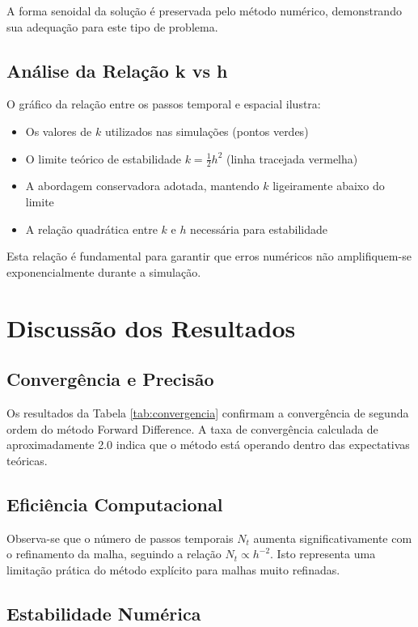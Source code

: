 \documentclass[a4paper, 12pt]{article}
\begin{document}
A forma senoidal da solução é preservada pelo método numérico, demonstrando sua adequação para este tipo de problema.

\subsection{Análise da Relação k vs h}

O gráfico da relação entre os passos temporal e espacial ilustra:

\begin{itemize}
    \item Os valores de $k$ utilizados nas simulações (pontos verdes)
    \item O limite teórico de estabilidade $k = \frac{1}{2}h^2$ (linha tracejada vermelha)
    \item A abordagem conservadora adotada, mantendo $k$ ligeiramente abaixo do limite
    \item A relação quadrática entre $k$ e $h$ necessária para estabilidade
\end{itemize}

Esta relação é fundamental para garantir que erros numéricos não amplifiquem-se exponencialmente durante a simulação.

\section{Discussão dos Resultados}

\subsection{Convergência e Precisão}

Os resultados da Tabela \ref{tab:convergencia} confirmam a convergência de segunda ordem do método Forward Difference. A taxa de convergência calculada de aproximadamente 2.0 indica que o método está operando dentro das expectativas teóricas.

\subsection{Eficiência Computacional}

Observa-se que o número de passos temporais $N_t$ aumenta significativamente com o refinamento da malha, seguindo a relação $N_t \propto h^{-2}$. Isto representa uma limitação prática do método explícito para malhas muito refinadas.

\subsection{Estabilidade Numérica}
\end{document}
